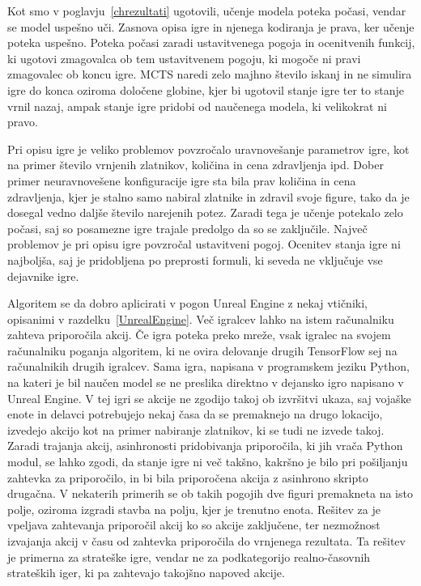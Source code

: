 \documentclass[a4paper, 12pt]{book}
\begin{document}
Kot smo v poglavju~\ref{chrezultati} ugotovili, učenje modela poteka počasi, vendar se model uspešno uči.
Zasnova opisa igre in njenega kodiranja je prava, ker učenje poteka uspešno.
Poteka počasi zaradi ustavitvenega pogoja in ocenitvenih funkcij, ki ugotovi zmagovalca ob tem ustavitvenem pogoju, ki mogoče ni pravi zmagovalec ob koncu igre.
MCTS naredi zelo majhno število iskanj in ne simulira igre do konca oziroma določene globine, kjer bi ugotovil stanje igre ter to stanje vrnil nazaj, ampak stanje igre pridobi od naučenega modela, ki velikokrat ni pravo.




Pri opisu igre je veliko problemov povzročalo uravnovešanje parametrov igre, kot na primer število vrnjenih zlatnikov, količina in cena zdravljenja ipd.
Dober primer neuravnovešene konfiguracije igre sta bila prav količina in cena zdravljenja, kjer je stalno samo nabiral zlatnike in zdravil svoje figure, tako da je dosegal vedno daljše število narejenih potez.
Zaradi tega je učenje potekalo zelo počasi, saj so posamezne igre trajale predolgo da so se zaključile.
Največ problemov je pri opisu igre povzročal ustavitveni pogoj.
Ocenitev stanja igre ni najboljša, saj je pridobljena po preprosti formuli, ki seveda ne vključuje vse dejavnike igre.



Algoritem se da dobro aplicirati v pogon Unreal Engine z nekaj vtičniki, opisanimi v razdelku~\ref{UnrealEngine}. Več igralcev lahko na istem računalniku zahteva priporočila akcij. 
Če igra poteka preko mreže, vsak igralec na svojem računalniku poganja algoritem, ki ne ovira delovanje drugih TensorFlow sej na računalnikih drugih igralcev.
Sama igra, napisana v programskem jeziku Python, na kateri je bil naučen model se ne preslika direktno v dejansko igro napisano v Unreal Engine.
V tej igri se akcije ne zgodijo takoj ob izvršitvi ukaza, saj vojaške enote in delavci potrebujejo nekaj časa da se premaknejo na drugo lokacijo, izvedejo akcijo kot na primer nabiranje zlatnikov, ki se tudi ne izvede takoj.
Zaradi trajanja akcij, asinhronosti pridobivanja priporočila, ki jih vrača Python modul, se lahko zgodi, da stanje igre ni več takšno, kakršno je bilo pri pošiljanju zahtevka za priporočilo, in bi bila priporočena akcija z asinhrono skripto drugačna. 
V nekaterih primerih se ob takih pogojih dve figuri premakneta na isto polje, oziroma izgradi stavba na polju, kjer je trenutno enota. 
Rešitev za je vpeljava zahtevanja priporočil akcij ko so akcije zaključene, ter nezmožnost izvajanja akcij v času od zahtevka priporočila do vrnjenega rezultata.
Ta rešitev je primerna za strateške igre, vendar ne za podkategorijo realno-časovnih strateških iger, ki pa zahtevajo takojšno napoved akcije.
\end{document}
